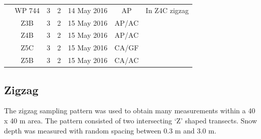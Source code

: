 \documentclass[12pt]{article}
\begin{document}
\begin{table}[]
\begin{tabular}{ccccccl}
                      & WP 744            & 3                                                               & 2                                                                             & 14 May 2016   & AP                 & In Z4C zigzag                                                                \\
                      & Z3B               & 3                                                               & 2                                                                             & 15 May 2016   & AP/AC              &                                                                              \\
                      & Z4B               & 3                                                               & 2                                                                             & 15 May 2016   & AP/AC              &                                                                              \\
                      & Z5C               & 3                                                               & 2                                                                             & 15 May 2016   & CA/GF              &                                                                              \\
                      & Z5B               & 3                                                               & 2                                                                             & 15 May 2016   & CA/AC              &                                                                             
\end{tabular}
\end{table}



\subsection{Zigzag}

The zigzag sampling pattern was used to obtain many measurements within a 40 x 40 m area.  The pattern consisted of two intersecting `Z' shaped transects. Snow depth was measured with random spacing between 0.3 m and 3.0 m. 
\end{document}
